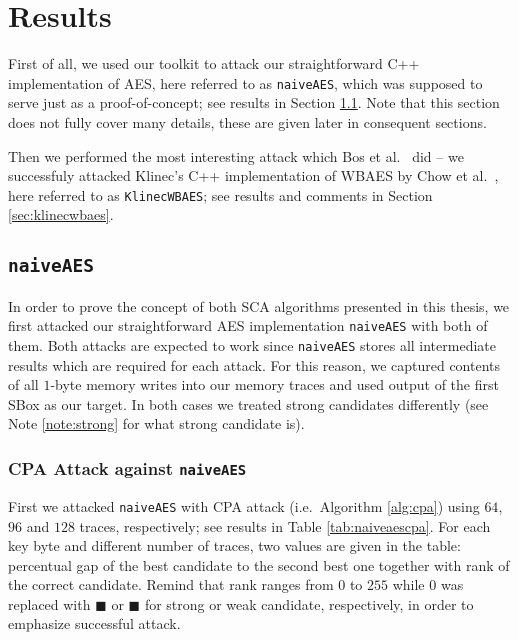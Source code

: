 \section{Results}
\label{sec:results}

First of all, we used our toolkit to attack our straightforward C++ implementation of AES, here referred to as {\tt naiveAES}, which was supposed to serve just as a proof-of-concept; see results in Section \ref{sec:naiveaes}. Note that this section does not fully cover many details, these are given later in consequent sections.

Then we performed the most interesting attack which Bos et al.\ \cite{bos2015differential} did -- we successfuly attacked Klinec's C++ implementation \cite{klinec2013implementation} of WBAES by Chow et al.\ \cite{chow2002aes}, here referred to as {\tt KlinecWBAES}; see results and comments in Section \ref{sec:klinecwbaes}.



\subsection{\tt naiveAES}
\label{sec:naiveaes}

In order to prove the concept of both SCA algorithms presented in this thesis, we first attacked our straightforward AES implementation {\tt naiveAES} with both of them. Both attacks are expected to work since {\tt naiveAES} stores all intermediate results which are required for each attack. For this reason, we captured contents of all $1$-byte memory writes into our memory traces and used output of the first SBox as our target. In both cases we treated strong candidates differently (see Note \ref{note:strong} for what strong candidate is).

\subsubsection{CPA Attack against {\tt naiveAES}}
	
	First we attacked {\tt naiveAES} with CPA attack (i.e.\ Algorithm \ref{alg:cpa}) using $64$, $96$ and $128$ traces, respectively; see results in Table \ref{tab:naiveaescpa}. For each key byte and different number of traces, two values are given in the table: percentual gap of the best candidate to the second best one together with rank of the correct candidate. Remind that rank ranges from $0$ to $255$ while $0$ was replaced with $\blacksquare$ or {\weak$\blacksquare$} for strong or weak candidate, respectively, in order to emphasize successful attack.
	
